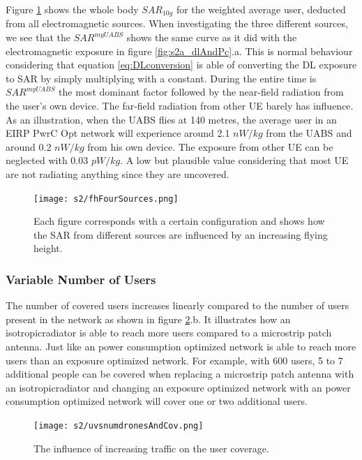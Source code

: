 \documentclass[twocolumn]{phdsymp} %
\begin{document}
Figure \ref{fig:s2shfourSourcesMatrix} shows the whole body $SAR_{10g}$ for the weighted average user, deducted from all electromagnetic sources. 
When investigating the three different sources, we see 
that the $SAR^{myUABS}$ shows the same curve as it did with the electromagnetic exposure 
in figure \ref{fig:s2a_dlAndPc}.a. This is normal behaviour considering that equation \ref{eq:DLconversion} is able of 
converting the \gls{DL} exposure to \gls{SAR} by simply multiplying with a constant.
During the entire time is $SAR^{myUABS}$ the most dominant factor followed by 
 the near-field radiation from the user's own device.
The far-field radiation from other \gls{UE} barely has influence. 
As an illustration, when the \gls{UABS} flies at 140 metres, the average user in an \gls{EIRP} \gls{PwrC Opt} network will 
experience around  2.1 $nW/kg$ from the \gls{UABS} and around 0.2 $nW/kg$ from his own device.
The exposure from other \gls{UE} can be neglected with 0.03 $pW/kg$. A low but plausible value considering that most 
\gls{UE} are not radiating anything since they are uncovered.

\begin{figure}[h!]
  \texttt{[image: s2/fhFourSources.png]}
  \caption{Each figure corresponds with a certain configuration and shows how the \acs{SAR} from 
  different sources are influenced by an increasing flying height.}
  \label{fig:s2shfourSourcesMatrix}
\end{figure}

\subsubsection{Variable Number of Users}
The number of covered users increases linearly compared to the number of users present in the network as shown in figure 
\ref{fig:s2uvsnumcovusers}.b. It illustrates how an \gls{isotropicradiator} is able to reach more users 
compared to a microstrip patch antenna. Just like an power consumption optimized network 
is able to reach more users than an exposure optimized network.
For example, with 600 users, 5 to 7 additional 
people can be covered when replacing a microstrip patch antenna with an \gls{isotropicradiator}
and changing an exposure optimized network with an power consumption optimized network will 
cover one or two additional users.
\begin{figure}[h!]
  \texttt{[image: s2/uvsnumdronesAndCov.png]}
  \caption{The influence of increasing traffic on the user coverage.}
  \label{fig:s2uvsnumcovusers}
\end{figure}
\end{document}
